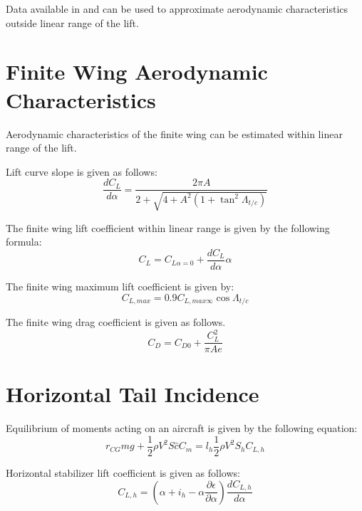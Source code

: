 Data available in \cite{NACA-TN-3361} and \cite{SheldahiKlimas1981} can be used to approximate aerodynamic characteristics outside linear range of the lift.

\section{Finite Wing Aerodynamic Characteristics}

Aerodynamic characteristics of the finite wing can be estimated within linear range of the lift.

Lift curve slope is given as follows: \cite{Corke2003}
\begin{equation}
  \frac{dC_L}{d\alpha}
  =
  \frac{
    2\pi A
  }
  {
    2
    +
    \sqrt{ 4 + A^2 \left( 1 + \tan^2 \Lambda_{t/c} \right) }
  }
\end{equation}

The finite wing lift coefficient within linear range is given by the following formula: \cite{Corke2003}
\begin{equation}
  C_L = C_{L \alpha = 0} + \frac{dC_L}{d \alpha} \alpha
\end{equation}

The finite wing maximum lift coefficient is given by: \cite{Raymer1992}
\begin{equation}
  C_{L,max} = 0.9 C_{L,max \infty} \cos \Lambda_{t/c}
\end{equation}

The finite wing drag coefficient is given as follows. \cite{Corke2003}
\begin{equation}
  C_D = C_{D0} + \frac{C_L^2}{\pi A e}
\end{equation}

\section{Horizontal Tail Incidence}

Equilibrium of moments acting on an aircraft is given by the following equation:
\begin{equation}
  \label{eq-aero-equilibrium-moments}
  r_{CG} mg + \frac{1}{2} \rho V^2 S \hat c C_m
  =
  l_h \frac{1}{2} \rho V^2 S_h C_{L,h}
\end{equation}

Horizontal stabilizer lift coefficient is given as follows:
\begin{equation}
  \label{eq-aero-lift-coef-stab-h}
  C_{L,h}
  =
  \left(
    \alpha + i_h - \alpha \frac{\partial \epsilon}{\partial \alpha}
  \right)
  \frac{d C_{L,h}}{d \alpha}
\end{equation}

